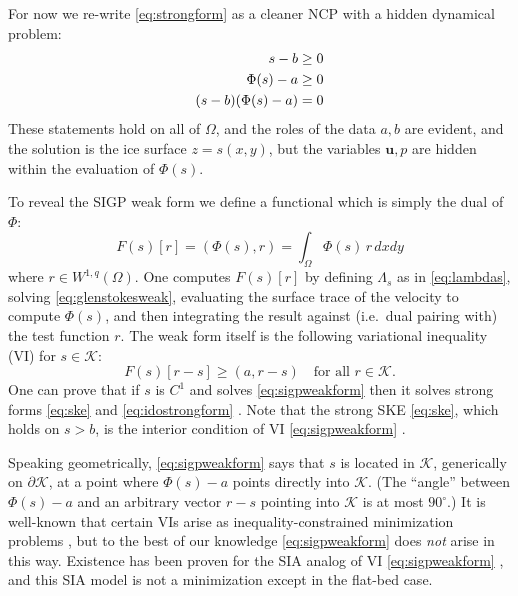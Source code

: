 \documentclass[letterpaper,final,12pt,reqno]{amsart}
\theoremstyle{claim}
\newcommand{\bu}{\mathbf{u}}
\newcommand{\ip}[2]{\left(#1,#2\right)}
\numberwithin{equation}{section}
\numberwithin{figure}{section}
\numberwithin{table}{section}
\numberwithin{theorem}{section}
\begin{document}
For now we re-write \eqref{eq:strongform} as a cleaner NCP with a hidden dynamical problem:
\begin{align}
s - b &\ge 0  \label{eq:idostrongform} \\
\Phi(s) - a &\ge 0 \notag \\
(s - b) (\Phi(s) - a) &= 0 \notag
\end{align}
These statements hold on all of $\Omega$, and the roles of the data $a,b$ are evident, and the solution is the ice surface $z=s(x,y)$, but the variables $\bu,p$ are hidden within the evaluation of $\Phi(s)$.

To reveal the SIGP weak form we define a functional which is simply the dual of $\Phi$:
\begin{equation}
F(s)[r] = \ip{\Phi(s)}{r} = \int_\Omega \Phi(s)\, r \,dx dy \label{eq:sigpfunctional}
\end{equation}
where $r \in W^{1,q}(\Omega)$.  One computes $F(s)[r]$ by defining $\Lambda_s$ as in \eqref{eq:lambdas}, solving \eqref{eq:glenstokesweak}, evaluating the surface trace of the velocity to compute $\Phi(s)$, and then integrating the result against (i.e.~dual pairing with) the test function $r$.  The weak form itself is the following variational inequality (VI) \cite{KinderlehrerStampacchia1980} for $s\in\mathcal{K}$:
\begin{equation}
F(s)[r - s] \ge \ip{a}{r-s} \quad \text{for all $r \in \mathcal{K}$.}  \label{eq:sigpweakform}
\end{equation}
One can prove that if $s$ is $C^1$ and solves \eqref{eq:sigpweakform} then it solves strong forms \eqref{eq:ske} and \eqref{eq:idostrongform} \cite{Bueler2021conservation}.  Note that the strong SKE \eqref{eq:ske}, which holds on $s>b$, is the interior condition of VI \eqref{eq:sigpweakform} \cite{KinderlehrerStampacchia1980}.

Speaking geometrically, \eqref{eq:sigpweakform} says that $s$ is located in $\mathcal{K}$, generically on $\partial\mathcal{K}$, at a point where $\Phi(s)-a$ points directly into $\mathcal{K}$.  (The ``angle'' between $\Phi(s)-a$ and an arbitrary vector $r-s$ pointing into $\mathcal{K}$ is at most $90^\circ$.)  It is well-known that certain VIs arise as inequality-constrained minimization problems \cite{GraeserKornhuber2009,KinderlehrerStampacchia1980}, but to the best of our knowledge \eqref{eq:sigpweakform} does \emph{not} arise in this way.  Existence has been proven for the SIA analog of VI \eqref{eq:sigpweakform} \cite{JouvetBueler2012}, and this SIA model is not a minimization except in the flat-bed case.
\end{document}
